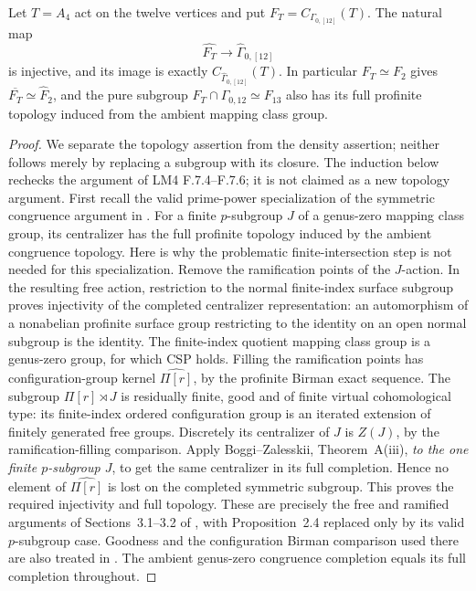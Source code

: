 Let $T=A_4$ act on the twelve vertices and put
$F_T=C_{\Gamma_{0,[12]}}(T)$.  The natural map
\[
              \widehat{F_T}\longrightarrow\widehat\Gamma_{0,[12]}
                                                               \tag{B.30.1}
\]
is injective, and its image is exactly
$C_{\widehat\Gamma_{0,[12]}}(T)$.  In particular $F_T\simeq F_2$
gives $\overline{F_T}\simeq\widehat F_2$, and the pure subgroup
$F_T\cap\Gamma_{0,12}\simeq F_{13}$ also has its full profinite
topology induced from the ambient mapping class group.

\begin{proof}
We separate the topology assertion from the density assertion;
neither follows merely by replacing a subgroup with its closure.
The induction below rechecks the argument of LM4 F.7.4--F.7.6;
it is not claimed as a new topology argument.
First recall the valid prime-power specialization of the
symmetric congruence argument in \cite{CEBoggiSymmetric2026}.
For a finite $p$-subgroup $J$ of a genus-zero mapping class group,
its centralizer has the full profinite topology induced by
the ambient congruence topology.  Here is why the problematic
finite-intersection step is not needed for this specialization.
Remove the ramification points of the $J$-action.  In the
resulting free action, restriction to the normal finite-index
surface subgroup proves injectivity of the completed
centralizer representation: an automorphism of a nonabelian
profinite surface group restricting to the identity on an open
normal subgroup is the identity.  The finite-index quotient
mapping class group is a genus-zero group, for which CSP holds.
Filling the ramification points has configuration-group kernel
$\widehat{\Pi[r]}$, by the profinite Birman exact sequence.
The subgroup $\Pi[r]\rtimes J$ is residually finite, good and
of finite virtual cohomological type: its finite-index ordered
configuration group is an iterated extension of finitely
generated free groups.  Discretely its centralizer of $J$ is
$Z(J)$, by the ramification-filling comparison.  Apply
Boggi--Zalesskii, Theorem~A(iii), \emph{to the one finite
$p$-subgroup $J$}, to get the same centralizer in its full
completion.  Hence no element of $\widehat{\Pi[r]}$ is lost
on the completed symmetric subgroup.  This proves the required
injectivity and full topology.  These are precisely the free
and ramified arguments of Sections~3.1--3.2 of
\cite{CEBoggiSymmetric2026}, with Proposition~2.4 replaced
only by its valid $p$-subgroup case.  Goodness and the
configuration Birman comparison used there are also treated
in \cite{CEBoggiCongruence2020}.  The ambient genus-zero
congruence completion equals its full completion throughout.


\end{proof}
